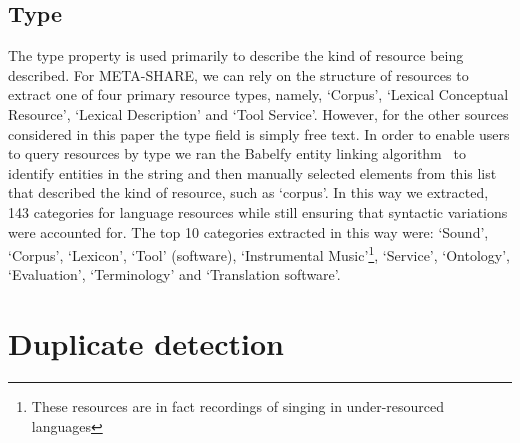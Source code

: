\documentclass[11pt]{article}
\begin{document}

%

\subsection{Type}

The type property is used primarily to describe the kind of resource being
described. For META-SHARE, we can rely on the structure of resources to extract
one of four primary resource types, namely, `Corpus', `Lexical Conceptual
Resource', `Lexical Description' and `Tool Service'. However, for the other
sources considered in this paper the type field is simply free text. In order 
to enable users to query resources by type we ran the Babelfy entity linking
algorithm~\cite{Moroetal:14tacl} to identify entities in the string and
then manually selected elements from this list that described the kind of
resource, such as `corpus'. In this way we extracted, 143 categories for
language resources while still ensuring that syntactic variations were accounted
for. The top 10 categories extracted in this way were: `Sound', `Corpus',
`Lexicon', `Tool' (software), `Instrumental Music'\footnote{These
resources are in fact recordings of singing in under-resourced languages}, `Service', `Ontology', `Evaluation',
`Terminology' and `Translation software'.

\section{Duplicate detection}

\label{duplicates}
\end{document}
